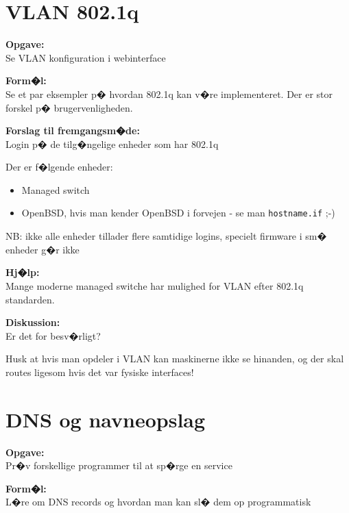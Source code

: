 \documentclass[a4paper,11pt,notitlepage]{oevelser}
\begin{document}
\chapter{VLAN 802.1q}
\label{ex:vlan}


{\bfseries Opgave:} \\
Se VLAN konfiguration i webinterface

{\bfseries Form�l:}\\
Se et par eksempler p� hvordan 802.1q kan v�re implementeret. Der er stor forskel p� brugervenligheden.

{\bfseries Forslag til fremgangsm�de:} \\
Login p� de tilg�ngelige enheder som har 802.1q

Der er f�lgende enheder:
\begin{itemize}
\item Managed switch
\item OpenBSD, hvis man kender OpenBSD i forvejen - se man \verb+hostname.if+ ;-)
\end{itemize}

NB: ikke alle enheder tillader flere samtidige logins, specielt firmware i sm� enheder g�r ikke

{\bfseries Hj�lp:} \\
Mange moderne managed switche har mulighed for VLAN efter 802.1q standarden.

{\bfseries Diskussion:}\\
Er det for besv�rligt?

Husk at hvis man opdeler i VLAN kan maskinerne ikke se hinanden, og der skal routes ligesom hvis det var fysiske interfaces!






\chapter{DNS og navneopslag}
\label{ex:basic-dns-lookup}

{\bfseries Opgave:}\\
Pr�v forskellige programmer til at sp�rge en service

{\bfseries Form�l:}\\
L�re om DNS records og hvordan man kan sl� dem op programmatisk
\end{document}
